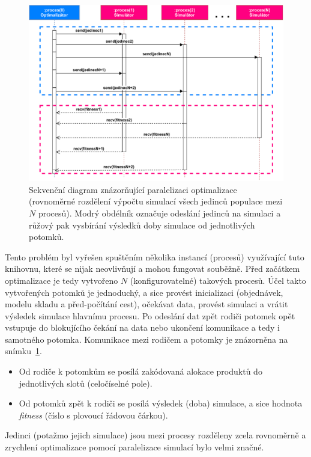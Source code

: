 \begin{figure}[t]
    \centering
    \includegraphics[width=0.8\linewidth]{figures/implementace/SimulationMessageSequence.pdf}
    \caption{Sekvenční diagram znázorňující paralelizaci optimalizace (rovnoměrné rozdělení výpočtu simulací všech jedinců populace mezi $N$ procesů). Modrý obdélník označuje odeslání jedinců na simulaci a růžový pak vysbírání výsledků doby simulace od jednotlivých potomků.}
    \label{fig:simulationMsgSeq}
\end{figure}

Tento problém byl vyřešen spuštěním několika instancí (procesů) využívající tuto knihovnu, které se nijak neovlivňují a mohou fungovat souběžně. Před začátkem optimalizace je tedy vytvořeno $N$ (konfigurovatelné) takových procesů. Účel takto vytvořených potomků je jednoduchý, a sice provést inicializaci (objednávek, modelu skladu a před-počítání cest), očekávat data, provést simulaci a vrátit výsledek simulace hlavnímu procesu. Po odeslání dat zpět rodiči potomek opět vstupuje do blokujícího čekání na data nebo ukončení komunikace a tedy i samotného potomka. Komunikace mezi rodičem a potomky je znázorněna na snímku~\ref{fig:simulationMsgSeq}.

\begin{itemize}
    \item Od rodiče k potomkům se posílá zakódovaná alokace produktů do jednotlivých slotů (celočíselné pole).
    \item Od potomků zpět k rodiči se posílá výsledek (doba) simulace, a sice hodnota \emph{fitness} (číslo s plovoucí řádovou čárkou).
\end{itemize}

Jedinci (potažmo jejich simulace) jsou mezi procesy rozděleny zcela rovnoměrně a zrychlení optimalizace pomocí paralelizace simulací bylo velmi značné.



